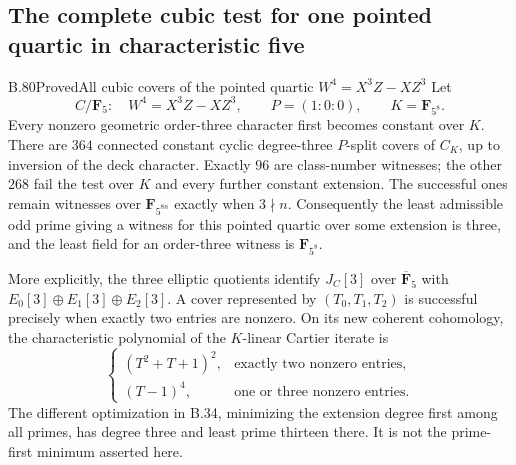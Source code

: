 \subsection{The complete cubic test for one pointed quartic in characteristic five}

\begin{claim}{B.80}{Proved}{All cubic covers of the pointed quartic $W^4=X^3Z-XZ^3$}
Let
\[
 C/\mathbf F _5:\quad W^4=X^3Z-XZ^3,
 \qquad P=(1:0:0),\qquad K=\mathbf F _{5^8}.
\]
Every nonzero geometric order-three character first becomes constant
over $K$. There are $364$ connected constant cyclic degree-three
$P$-split covers of $C_K$, up to inversion of the deck character.
Exactly $96$ are class-number witnesses; the other $268$ fail the
test over $K$ and every further constant extension. The successful
ones remain witnesses over $\mathbf F _{5^{8n}}$ exactly when
$3\nmid n$. Consequently the least admissible odd prime giving a
witness for this pointed quartic over some extension is three, and
the least field for an order-three witness is $\mathbf F _{5^8}$.

More explicitly, the three elliptic quotients identify
$J_C[3]$ over $\overline{\mathbf F}_5$ with
$E_0[3]\oplus E_1[3]\oplus E_2[3]$. A cover represented by
$(T_0,T_1,T_2)$ is successful precisely when exactly two entries
are nonzero. On its new coherent cohomology, the characteristic
polynomial of the $K$-linear Cartier iterate is
\[
 \begin{cases}
 (T^2+T+1)^2,&\text{exactly two nonzero entries},\\
 (T-1)^4,&\text{one or three nonzero entries}.
 \end{cases}                                                   \tag{B.80.1}
\]
The different optimization in B.34, minimizing the extension degree
first among all primes, has degree three and least prime thirteen
there. It is not the prime-first minimum asserted here.
\end{claim}

